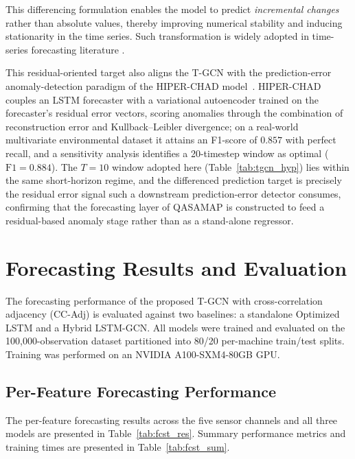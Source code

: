 This differencing formulation enables the model to predict \emph{incremental changes} rather than absolute values, thereby improving numerical stability and inducing stationarity in the time series. Such transformation is widely adopted in time-series forecasting literature \cite{hyndman2018forecasting}.

This residual-oriented target also aligns the T-GCN with the prediction-error anomaly-detection paradigm of the HIPER-CHAD model~\cite{widartha_hiper_chad_2025}. HIPER-CHAD couples an LSTM forecaster with a variational autoencoder trained on the forecaster's residual error vectors, scoring anomalies through the combination of reconstruction error and Kullback--Leibler divergence; on a real-world multivariate environmental dataset it attains an F1-score of $0.857$ with perfect recall, and a sensitivity analysis identifies a 20-timestep window as optimal ($\mathrm{F1} = 0.884$). The $T = 10$ window adopted here (Table~\ref{tab:tgcn_hyp}) lies within the same short-horizon regime, and the differenced prediction target is precisely the residual error signal such a downstream prediction-error detector consumes, confirming that the forecasting layer of QASAMAP is constructed to feed a residual-based anomaly stage rather than as a stand-alone regressor.

\section{Forecasting Results and Evaluation}

The forecasting performance of the proposed T-GCN with cross-correlation adjacency (CC-Adj) is evaluated against two baselines: a standalone Optimized LSTM and a Hybrid LSTM-GCN. All models were trained and evaluated on the 100,000-observation dataset partitioned into 80/20 per-machine train/test splits. Training was performed on an NVIDIA A100-SXM4-80GB GPU.

\subsection{Per-Feature Forecasting Performance}

The per-feature forecasting results across the five sensor channels and all three models are presented in Table~\ref{tab:fcst_res}. Summary performance metrics and training times are presented in Table~\ref{tab:fcst_sum}.

